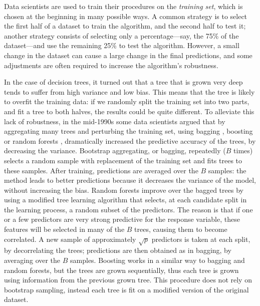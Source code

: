 \documentclass{statsoc}
\begin{document}
Data scientists are used to train their procedures on the \emph{training set}, which is chosen at the beginning in many possible ways. A common strategy is to select the first half of a 
dataset to train the algorithm, and the second half to test it; another strategy consists of selecting only a percentage---say, the 75\% of the dataset---and use the remaining 25\% to  test the algorithm. However, a small change in the dataset can cause a large change in the final predictions, and some adjustments are often required to increase the algorithm's robustness. 

In the case of decision trees, it turned out that a tree that is grown very deep tends to suffer from high variance and low bias. This means that the tree is likely to 
overfit the training data: if we randomly split the training set into two parts, and fit a tree to both halves, the results could be quite different. To alleviate this lack of 
robustness, in the mid-1990s some data scientists argued that by aggregating many trees and perturbing the training set, using bagging \citep{breiman1996bagging}, boosting 
\citep{freund1996experiments} or random forests \citep{ho1995random}, dramatically increased the predictive accuracy of the trees, by decreasing the variance. Bootstrap 
aggregating, or bagging, repeatedly ($B$ times) selects a random sample with replacement of the training set and fits trees to these samples. After training, predictions are averaged 
over the $B$ samples: the method leads to better predictions  because it decreases the variance of the model, without increasing the bias. Random forests improve over the bagged 
trees by using a modified tree learning algorithm that selects, at each candidate split in the learning process, a random subset of the predictors. The reason is that if one or a few 
predictors are very strong predictive for the response variable, these features will be selected in many of the $B$ trees, causing them to become correlated. A new sample of 
approximately $\sqrt{p}$ predictors is taken at each split, by decorrelating the trees; predictions are then obtained as in bagging, by averaging over the $B$ samples. Boosting 
works in a similar way to bagging and random forests, but the trees are grown sequentially, thus each tree is grown using information from the previous grown tree. This procedure does 
not rely on bootstrap sampling, instead each tree is fit on a modified version of the original dataset.


\color{blue}
\end{document}
